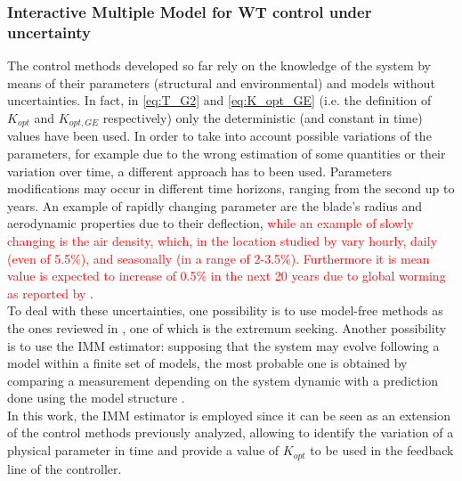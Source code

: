                     

\subsubsection{Interactive Multiple Model for WT control under uncertainty}\label{sec:c_other_controls}
The control methods developed so far rely on the knowledge of the system by means of their parameters (structural and environmental) and models without uncertainties. In fact, in \autoref{eq:T_G2} and \autoref{eq:K_opt_GE} (i.e. the definition of $K_{opt}$ and $K_{opt,GE}$ respectively) only the deterministic (and constant in time) values have been used. In order to take into account possible variations of the parameters, for example due to the wrong estimation of some quantities or their variation over time, a different approach has to been used. Parameters modifications may occur in different time horizons, ranging from the second up to years. An example of rapidly changing parameter are the blade's radius and aerodynamic properties due to their deflection, \textcolor{red}{while an example of slowly changing is the air density, which, in the location studied by \cite{air_density} vary hourly, daily (even of 5.5\%), and seasonally (in a range of 2-3.5\%). Furthermore it is mean value is expected to increase of 0.5\% in the next 20 years due to global worming as reported by \cite{en12112038}}. \\
To deal with these uncertainties, one possibility is to use model-free methods as the ones reviewed in \cite{MOUSA2021106598}, one of which is the extremum seeking. Another possibility is to use the \acrfull{IMM} estimator: supposing that the system may evolve following a model within a finite set of models, the most probable one is obtained by comparing a measurement depending on the system dynamic with a prediction done using the model structure \cite{Bar_Shalom}. \\
In this work, the IMM estimator is employed since it can be seen as an extension of the control methods previously analyzed, allowing to identify the variation of a physical parameter in time and provide a value of $K_{opt}$ to be used in the feedback line of the controller.

